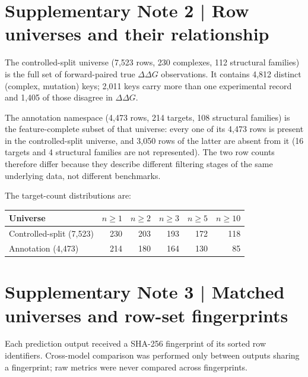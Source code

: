 \documentclass[11pt,a4paper]{article}
\begin{document}
\section*{Supplementary Note 2 | Row universes and their relationship}
The controlled-split universe (7,523 rows, 230 complexes,
112 structural families) is the full set of forward-paired true
$\Delta\Delta G$ observations. It contains 4,812 distinct
(complex, mutation) keys; 2,011 keys carry more than one
experimental record and 1,405 of those disagree in
$\Delta\Delta G$.\par
The annotation namespace (4,473 rows, 214 targets,
108 structural families) is the feature-complete subset of that universe:
every one of its 4,473 rows is present in the controlled-split universe, and
3,050 rows of the latter are absent from it
(16 targets and
4 structural families are not
represented). The two row counts therefore differ because they describe different
filtering stages of the same underlying data, not different benchmarks.\par
The target-count distributions are:
\begin{center}\begin{tabular}{@{}lrrrrr@{}}\toprule
Universe & $n \geq 1$ & $n \geq 2$ & $n \geq 3$ & $n \geq 5$ & $n \geq 10$ \\
\midrule
Controlled-split (7,523) & 230 & 203 & 193 & 172 & 118 \\
Annotation (4,473) & 214 & 180 & 164 & 130 & 85 \\
\bottomrule\end{tabular}\end{center}

\section*{Supplementary Note 3 | Matched universes and row-set fingerprints}
Each prediction output received a SHA-256 fingerprint of its sorted row identifiers.
Cross-model comparison was performed only between outputs sharing a fingerprint; raw metrics
were never compared across fingerprints.
\end{document}

